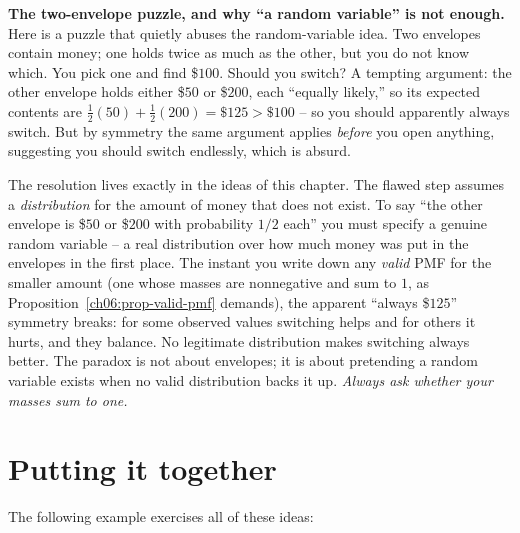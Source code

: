 \begin{paradoxbox}
\textbf{The two-envelope puzzle, and why ``a random variable'' is not enough.}
Here is a puzzle that quietly abuses the random-variable idea. Two envelopes contain
money; one holds twice as much as the other, but you do not know which. You pick one
and find \$$100$. Should you switch? A tempting argument: the other envelope holds
either \$$50$ or \$$200$, each ``equally likely,'' so its expected contents are
$\tfrac12(50) + \tfrac12(200) = \$125 > \$100$ -- so you should apparently always switch. But by symmetry the
same argument applies \emph{before} you open anything, suggesting you should switch
endlessly, which is absurd.

The resolution lives exactly in the ideas of this chapter. The flawed step assumes
a \emph{distribution} for the amount of money that does not exist. To say ``the
other envelope is \$$50$ or \$$200$ with probability $1/2$ each'' you must specify a
genuine random variable -- a real distribution over how much money was put in the
envelopes in the first place. The instant you write down any \emph{valid} PMF for the
smaller amount (one whose masses are nonnegative and sum to $1$, as
Proposition~\ref{ch06:prop-valid-pmf} demands), the apparent ``always \$$125$''
symmetry breaks: for some observed values switching helps and for others it hurts, and
they balance. No legitimate distribution makes switching always better. The paradox is
not about envelopes; it is about pretending a random variable exists when no valid
distribution backs it up. \emph{Always ask whether your masses sum to one.}
\end{paradoxbox}

\section{Putting it together}
\label{ch06:synthesis}

The following example exercises all of these ideas:

